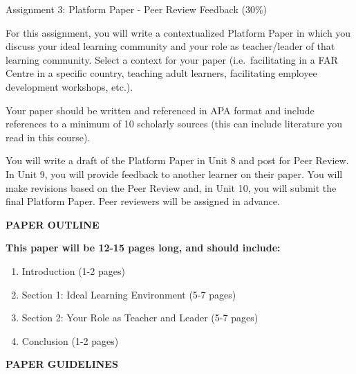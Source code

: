 \documentclass[
]{book}
\providecommand{\tightlist}{%
  \setlength{\itemsep}{0pt}\setlength{\parskip}{0pt}}
\begin{document}
\begin{assessment}
{Assignment 3: Platform Paper - Peer Review Feedback (30\%)}

For this assignment, you will write a contextualized Platform Paper in which you discuss your ideal learning community and your role as teacher/leader of that learning community. Select a context for your paper (i.e.~facilitating in a FAR Centre in a specific country, teaching adult learners, facilitating employee development workshops, etc.).

Your paper should be written and referenced in APA format and include references to a minimum of 10 scholarly sources (this can include literature you read in
this course).

You will write a draft of the Platform Paper in Unit 8 and post for Peer Review. In Unit 9, you will provide feedback to another learner on their paper. You will make revisions based on the Peer Review and, in Unit 10, you will submit the final Platform Paper. Peer reviewers will be assigned in advance.

\textbf{PAPER OUTLINE}

\textbf{This paper will be 12-15 pages long, and should include:}

\begin{enumerate}
\def\labelenumi{\arabic{enumi}.}
\tightlist
\item
  Introduction (1-2 pages)\\
\item
  Section 1: Ideal Learning Environment (5-7 pages)\\
\item
  Section 2: Your Role as Teacher and Leader (5-7 pages)\\
\item
  Conclusion (1-2 pages)
\end{enumerate}

\textbf{PAPER GUIDELINES}


\end{assessment}
\end{document}
